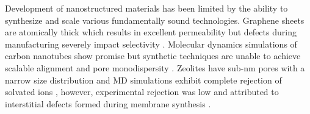 Development of nanostructured materials has been limited by the ability
to synthesize and scale various fundamentally sound technologies.
Graphene sheets are atomically thick which results in excellent permeability
but defects during manufacturing severely impact selectivity 
\cite{cohen-tanugi_multilayer_2016}. Molecular dynamics simulations of
carbon nanotubes show promise \cite{humplik_nanostructured_2011} but 
synthetic techniques are unable to achieve scalable alignment and pore
monodispersity \cite{hata_water-assisted_2004,maruyama_growth_2005}.
Zeolites have sub-nm pores with a narrow size distribution and MD simulations
exhibit complete rejection of solvated ions \cite{murad_molecular_1998},
however, experimental rejection was low and attributed to interstitial
defects formed during membrane synthesis \cite{li_desalination_2004}.

